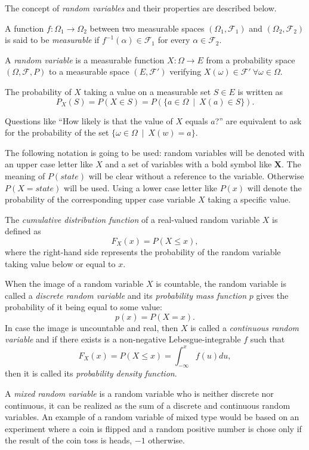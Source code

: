 The concept of \emph{random variables} and their properties are described below.

\begin{definition}
A function \(f:\Omega_1 \to \Omega_2\) between two
measurable spaces \((\Omega_1, \mathcal{F}_1)\) and \((\Omega_2, \mathcal{F}_2)\) is said to be \emph{measurable} if \(f^{-1}(\alpha) \in \mathcal{F}_1\) for every \(\alpha \in \mathcal{F}_2\).
\end{definition}

\begin{definition}
  A \emph{random variable} is a measurable function \(X:\Omega \to E\) from a probability
  space \((\Omega, \mathcal{F}, P)\) to a measurable space \((E,
  \mathcal{F}')\) verifying \(X(\omega)\in \mathcal{F}' \ \forall \omega \in \Omega\).

The probability of \(X\) taking a value on a measurable set \(S \in E\) is
written as
\[
P_X(S) = P(X \in S) = P(\{a \in \Omega \ \mid  \ X(a) \in S \}).
\]
\end{definition}

Questions like ``How likely is that the value of \(X\) equals
\(a\)?'' are equivalent to ask for the probability of the set \(\{\omega
\in \Omega \ \mid  \ X(w) = a\}\).

The following notation is going to be used: random variables will be
denoted with an upper case letter like \(X\) and a set of variables with a
bold symbol like \(\bm{X}\). The meaning of \(P(state)\) will be clear without a reference to the variable.
Otherwise \(P(X = state)\) will be used.
Using a lower case letter like \(P(x)\) will denote the probability of the
corresponding upper case variable \(X\) taking a specific value.

\begin{definition}
The \emph{cumulative distribution function} of a real-valued random variable \(X\) is defined as
\[
F_X (x) = P(X \leq x),
\]
where the right-hand side represents the probability of the random variable
taking value below or equal to \(x\).
\end{definition}

\begin{definition}
When the image of a random variable \(X\) is countable, the random variable
is called a
\emph{discrete random variable} and its \emph{probability mass function} \(p\) gives the
probability of it being equal to some value:
\[
p(x) = P(X = x).
\]
In case the image is uncountable and real, then \(X\) is called a \emph{continuous random
  variable} and if there exists is a non-negative
Lebesgue-integrable \(f\) such that
\[
F_X(x) = P(X \leq x) = \int_{-\infty}^x f(u) du,
\]
then it is called its \emph{probability density function}.

A \emph{mixed random variable} is a random variable who is neither discrete nor
continuous, it can be realized as the sum of a discrete and continuous random
variables. An example of a random variable of mixed type would be based on an
experiment where a coin is flipped and a random positive number is chose only if
the result of the coin toss is heads, $-1$ otherwise.
\end{definition}

